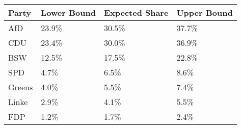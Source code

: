 \begin{tabular}{llll}
  \hline
Party & Lower Bound & Expected Share & Upper Bound \\ 
  \hline
AfD & 23.9\% & 30.5\% & 37.7\% \\ 
  CDU & 23.4\% & 30.0\% & 36.9\% \\ 
  BSW & 12.5\% & 17.5\% & 22.8\% \\ 
  SPD & 4.7\% & 6.5\% & 8.6\% \\ 
  Greens & 4.0\% & 5.5\% & 7.4\% \\ 
  Linke & 2.9\% & 4.1\% & 5.5\% \\ 
  FDP & 1.2\% & 1.7\% & 2.4\% \\ 
   \hline
\end{tabular}
